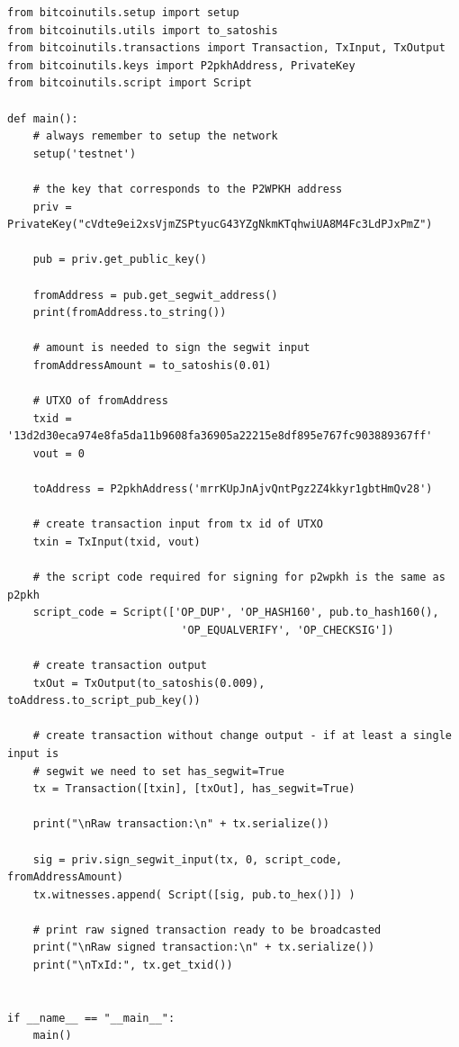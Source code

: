\vspace{1em}
\begin{lstlisting}[style=Python]
from bitcoinutils.setup import setup
from bitcoinutils.utils import to_satoshis
from bitcoinutils.transactions import Transaction, TxInput, TxOutput
from bitcoinutils.keys import P2pkhAddress, PrivateKey
from bitcoinutils.script import Script

def main():
    # always remember to setup the network
    setup('testnet')

    # the key that corresponds to the P2WPKH address
    priv = PrivateKey("cVdte9ei2xsVjmZSPtyucG43YZgNkmKTqhwiUA8M4Fc3LdPJxPmZ")

    pub = priv.get_public_key()

    fromAddress = pub.get_segwit_address()
    print(fromAddress.to_string())

    # amount is needed to sign the segwit input
    fromAddressAmount = to_satoshis(0.01)

    # UTXO of fromAddress
    txid = '13d2d30eca974e8fa5da11b9608fa36905a22215e8df895e767fc903889367ff'
    vout = 0

    toAddress = P2pkhAddress('mrrKUpJnAjvQntPgz2Z4kkyr1gbtHmQv28')

    # create transaction input from tx id of UTXO
    txin = TxInput(txid, vout)

    # the script code required for signing for p2wpkh is the same as p2pkh
    script_code = Script(['OP_DUP', 'OP_HASH160', pub.to_hash160(),
                           'OP_EQUALVERIFY', 'OP_CHECKSIG'])

    # create transaction output
    txOut = TxOutput(to_satoshis(0.009), toAddress.to_script_pub_key())

    # create transaction without change output - if at least a single input is
    # segwit we need to set has_segwit=True
    tx = Transaction([txin], [txOut], has_segwit=True)

    print("\nRaw transaction:\n" + tx.serialize())

    sig = priv.sign_segwit_input(tx, 0, script_code, fromAddressAmount)
    tx.witnesses.append( Script([sig, pub.to_hex()]) )

    # print raw signed transaction ready to be broadcasted
    print("\nRaw signed transaction:\n" + tx.serialize())
    print("\nTxId:", tx.get_txid())


if __name__ == "__main__":
    main()
\end{lstlisting}
\vspace{1em}


